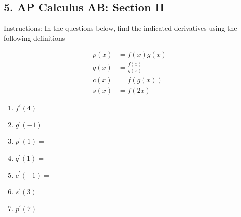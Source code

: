 \subsection{5. AP Calculus AB: Section
II}\label{ap-calculus-ab-section-ii}

Instructions: In the questions below, find the indicated derivatives
using the following definitions

\[
\begin{aligned}
p(x) & =f(x) g(x) \\
q(x) & =\frac{f(x)}{g(x)} \\
c(x) & =f(g(x)) \\
s(x) & =f(2 x)
\end{aligned}
\]

\begin{enumerate}
\def\labelenumi{\arabic{enumi}.}
\tightlist
\item
  \(f^{\prime}(4)=\)
\item
  \(g^{\prime}(-1)=\)
\item
  \(p^{\prime}(1)=\)
\item
  \(q^{\prime}(1)=\)
\item
  \(c^{\prime}(-1)=\)
\item
  \(s^{\prime}(3)=\)
\item
  \(p^{\prime}(7)=\)
\end{enumerate}
